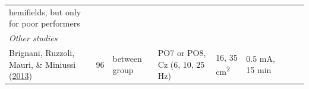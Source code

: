 \documentclass[11pt,]{memoir}
\begin{document}
\begin{longtable}[]{@{}lllllllll@{}}
\begin{minipage}[t]{0.24\columnwidth}
hemifields, but only for poor performers\strut
\end{minipage}\tabularnewline
\begin{minipage}[t]{0.12\columnwidth}\raggedright
\emph{Other studies}\strut
\end{minipage} & \begin{minipage}[t]{0.02\columnwidth}\raggedright
\strut
\end{minipage} & \begin{minipage}[t]{0.04\columnwidth}\raggedright
\strut
\end{minipage} & \begin{minipage}[t]{0.11\columnwidth}\raggedright
\strut
\end{minipage} & \begin{minipage}[t]{0.03\columnwidth}\raggedright
\strut
\end{minipage} & \begin{minipage}[t]{0.05\columnwidth}\raggedright
\strut
\end{minipage} & \begin{minipage}[t]{0.05\columnwidth}\raggedright
\strut
\end{minipage} & \begin{minipage}[t]{0.11\columnwidth}\raggedright
\strut
\end{minipage} & \begin{minipage}[t]{0.24\columnwidth}\raggedright
\strut
\end{minipage}\tabularnewline
\begin{minipage}[t]{0.12\columnwidth}\raggedright
Brignani, Ruzzoli, Mauri, \& Miniussi (\protect\hyperlink{ref-Brignani2013}{2013})\strut
\end{minipage} & \begin{minipage}[t]{0.02\columnwidth}\raggedright
96\strut
\end{minipage} & \begin{minipage}[t]{0.04\columnwidth}\raggedright
between
group\strut
\end{minipage} & \begin{minipage}[t]{0.11\columnwidth}\raggedright
PO7 or PO8, Cz (6, 10, 25
Hz)\strut
\end{minipage} & \begin{minipage}[t]{0.03\columnwidth}\raggedright
16,
35
cm\textsuperscript{2}\strut
\end{minipage} & \begin{minipage}[t]{0.05\columnwidth}\raggedright
0.5 mA, 15
min\strut
\end{minipage} & \begin{minipage}[t]{0.05\columnwidth}\raggedright

\end{minipage}
\end{longtable}
\end{document}
